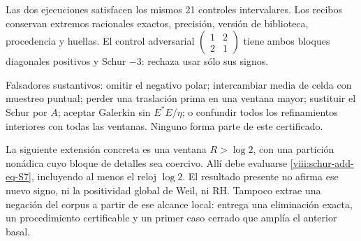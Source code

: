 
Las dos ejecuciones satisfacen los mismos 21 controles intervalares.
Los recibos conservan extremos racionales exactos, precisión, versión
de biblioteca, procedencia y huellas. El control adversarial
\(\begin{pmatrix}1&2\\2&1\end{pmatrix}\) tiene ambos bloques
diagonales positivos y Schur \(-3\): rechaza usar sólo sus signos.

Falsadores sustantivos: omitir el negativo polar; intercambiar media
de celda con muestreo puntual; perder una traslación prima en una
ventana mayor; sustituir el Schur por \(A\); aceptar Galerkin sin
\(E^*E/\eta\); o confundir todos los refinamientos interiores con
todas las ventanas. Ninguno forma parte de este certificado.

La siguiente extensión concreta es una ventana \(R>\log2\), con
una partición nonádica cuyo bloque de detalles sea coercivo. Allí
debe evaluarse \eqref{viii:schur-add-eq-S7}, incluyendo al menos el reloj \(\log2\).
El resultado presente no afirma ese nuevo signo, ni la positividad
global de Weil, ni RH. Tampoco extrae una negación del corpus a partir
de ese alcance local: entrega una eliminación exacta, un procedimiento
certificable y un primer caso cerrado que amplía el anterior basal.

